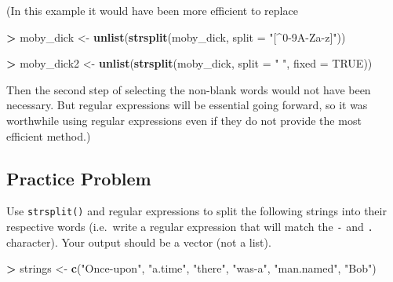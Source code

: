 \documentclass[
]{krantz}
\makeatletter
\newenvironment{Shaded}{\begin{snugshade}}{\end{snugshade}}
\newcommand{\DataTypeTok}[1]{\textcolor[rgb]{0.27,0.27,0.27}{#1}}
\newcommand{\KeywordTok}[1]{\textcolor[rgb]{0.27,0.27,0.27}{\textbf{#1}}}
\newcommand{\NormalTok}[1]{#1}
\newcommand{\OperatorTok}[1]{\textcolor[rgb]{0.43,0.43,0.43}{\textbf{#1}}}
\newcommand{\OtherTok}[1]{\textcolor[rgb]{0.37,0.37,0.37}{#1}}
\newcommand{\StringTok}[1]{\textcolor[rgb]{0.5,0.5,0.5}{#1}}
\newenvironment{kframe}{%
\medskip{}
\setlength{\fboxsep}{.8em}
 \def\at@end@of@kframe{}%
 \ifinner\ifhmode%
  \def\at@end@of@kframe{\end{minipage}}%
  \begin{minipage}{\columnwidth}%
 \fi\fi%
 \def\FrameCommand##1{\hskip\@totalleftmargin \hskip-\fboxsep
 \colorbox{shadecolor}{##1}\hskip-\fboxsep
     \hskip-\linewidth \hskip-\@totalleftmargin \hskip\columnwidth}%
 \MakeFramed {\advance\hsize-\width
   \@totalleftmargin\z@ \linewidth\hsize
   \@setminipage}}%
 {\par\unskip\endMakeFramed%
 \at@end@of@kframe}
\renewenvironment{Shaded}{\begin{kframe}}{\end{kframe}}
\makeatother
\begin{document}
(In this example it would have been more efficient to replace

\begin{Shaded}
\begin{Highlighting}[]
\OperatorTok{\textgreater{}}\StringTok{ }\NormalTok{moby\_dick \textless{}{-}}\StringTok{ }\KeywordTok{unlist}\NormalTok{(}\KeywordTok{strsplit}\NormalTok{(moby\_dick, }\DataTypeTok{split =} \StringTok{"[\^{}0{-}9A{-}Za{-}z]"}\NormalTok{))}
\end{Highlighting}
\end{Shaded}

\begin{Shaded}
\begin{Highlighting}[]
\OperatorTok{\textgreater{}}\StringTok{ }\NormalTok{moby\_dick2 \textless{}{-}}\StringTok{ }\KeywordTok{unlist}\NormalTok{(}\KeywordTok{strsplit}\NormalTok{(moby\_dick, }\DataTypeTok{split =} \StringTok{" "}\NormalTok{, }\DataTypeTok{fixed =} \OtherTok{TRUE}\NormalTok{))}
\end{Highlighting}
\end{Shaded}

Then the second step of selecting the non-blank words would not have been necessary. But regular expressions will be essential going forward, so it was worthwhile using regular expressions even if they do not provide the most efficient method.)

\hypertarget{practice-problem-14}{%
\subsection{Practice Problem}\label{practice-problem-14}}

Use \texttt{strsplit()} and regular expressions to split the following strings into their respective words (i.e.~write a regular expression that will match the \texttt{-} and \texttt{.} character). Your output should be a vector (not a list).

\begin{Shaded}
\begin{Highlighting}[]
\OperatorTok{\textgreater{}}\StringTok{ }\NormalTok{strings \textless{}{-}}\StringTok{ }\KeywordTok{c}\NormalTok{(}\StringTok{"Once{-}upon"}\NormalTok{, }\StringTok{"a.time"}\NormalTok{, }\StringTok{"there"}\NormalTok{, }\StringTok{"was{-}a"}\NormalTok{, }\StringTok{"man.named"}\NormalTok{, }\StringTok{"Bob"}\NormalTok{)}
\end{Highlighting}
\end{Shaded}
\end{document}
